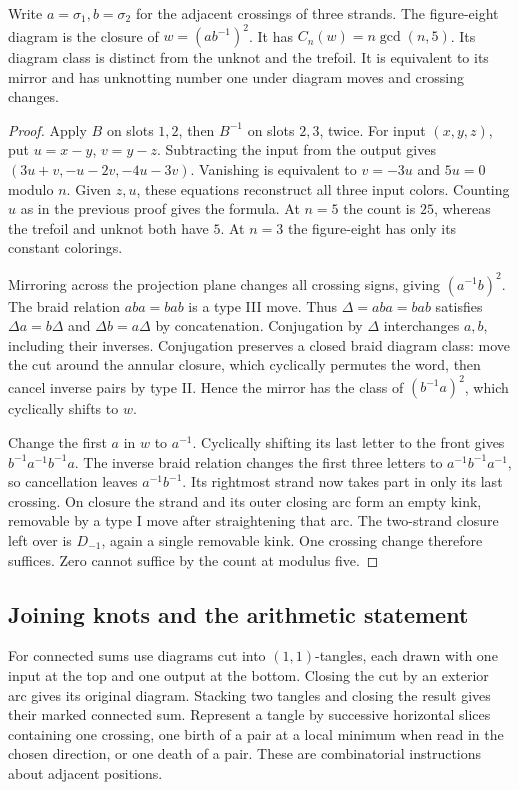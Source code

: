 \begin{proposition}\label{idx-knots98}
Write $a=\sigma_1,b=\sigma_2$ for the adjacent crossings of three
strands. The figure-eight diagram is the closure of $w=(ab^{-1})^2$.
It has $C_n(w)=n\gcd(n,5)$. Its diagram class is distinct from the
unknot and the trefoil. It is equivalent to its mirror and has
unknotting number one under diagram moves and crossing changes.
\end{proposition}
\begin{proof}
Apply $B$ on slots $1,2$, then $B^{-1}$ on slots $2,3$, twice.
For input $(x,y,z)$, put $u=x-y$, $v=y-z$. Subtracting the input from
the output gives $(3u+v,-u-2v,-4u-3v)$. Vanishing is equivalent to
$v=-3u$ and $5u=0$ modulo $n$. Given $z,u$, these equations reconstruct
all three input colors. Counting $u$ as in the previous proof gives the
formula. At $n=5$ the count is $25$, whereas the trefoil and unknot
both have $5$. At $n=3$ the figure-eight has only its constant colorings.

Mirroring across the projection plane changes all crossing signs, giving
$(a^{-1}b)^2$. The braid relation $aba=bab$ is a type III move. Thus
$\Delta=aba=bab$ satisfies $\Delta a=b\Delta$ and $\Delta b=a\Delta$ by
concatenation. Conjugation by $\Delta$ interchanges $a,b$, including
their inverses. Conjugation preserves a closed braid diagram class:
move the cut around the annular closure, which cyclically permutes the
word, then cancel inverse pairs by type II. Hence the mirror has the
class of $(b^{-1}a)^2$, which cyclically shifts to $w$.

Change the first $a$ in $w$ to $a^{-1}$. Cyclically shifting its last
letter to the front gives $b^{-1}a^{-1}b^{-1}a$. The inverse braid
relation changes the first three letters to $a^{-1}b^{-1}a^{-1}$, so
cancellation leaves $a^{-1}b^{-1}$. Its rightmost strand now takes
part in only its last crossing. On closure the strand and its outer
closing arc form an empty kink, removable by a type I move after
straightening that arc. The two-strand closure left over is $D_{-1}$,
again a single removable kink. One crossing change therefore suffices.
Zero cannot suffice by the count at modulus five.
\end{proof}

\subsection{Joining knots and the arithmetic statement}
For connected sums use diagrams cut into $(1,1)$-tangles, each drawn
with one input at the top and one output at the bottom. Closing the cut
by an exterior arc gives its original diagram. Stacking two tangles and
closing the result gives their marked connected sum. Represent a tangle
by successive horizontal slices containing one crossing, one birth of a
pair at a local minimum when read in the chosen direction, or one death
of a pair. These are combinatorial instructions about adjacent positions.

